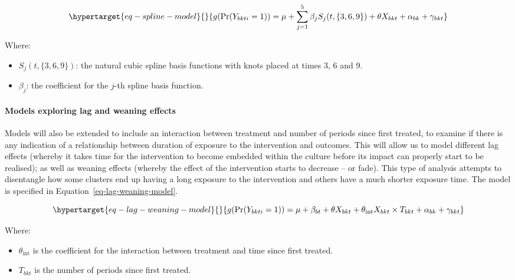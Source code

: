 \documentclass[
]{scrartcl}
\let\oldparagraph\paragraph
\renewcommand{\paragraph}[1]{\oldparagraph{#1}\mbox{}}
\providecommand{\tightlist}{%
  \setlength{\itemsep}{0pt}\setlength{\parskip}{0pt}}\usepackage{longtable,booktabs,array}
\begin{document}
\begin{equation}\protect\hypertarget{eq-spline-model}{}{
g(\text{Pr}(Y_{bkti} = 1)) = \mu + \sum_{j=1}^5 \beta_j S_j(t, \{3, 6, 9\}) + \theta X_{bkt} + \alpha_{bk} + \gamma_{bkt}
}\label{eq-spline-model}\end{equation}

Where:

\begin{itemize}
\tightlist
\item
  \(S_j(t, \{3, 6, 9\})\): the natural cubic spline basis functions with
  knots placed at times 3, 6 and 9.
\item
  \(\beta_j\): the coefficient for the \(j\)-th spline basis function.
\end{itemize}

\hypertarget{models-exploring-lag-and-weaning-effects}{%
\paragraph{Models exploring lag and weaning
effects}\label{models-exploring-lag-and-weaning-effects}}

Models will also be extended to include an interaction between treatment
and number of periods since first treated, to examine if there is any
indication of a relationship between duration of exposure to the
intervention and outcomes. This will allow us to model different lag
effects (whereby it takes time for the intervention to become embedded
within the culture before its impact can properly start to be realised);
as well as weaning effects (whereby the effect of the intervention
starts to decrease -- or fade). This type of analysis attempts to
disentangle how some clusters end up having a long exposure to the
intervention and others have a much shorter exposure time. The model is
specified in Equation~\ref{eq-lag-weaning-model}.

\begin{equation}\protect\hypertarget{eq-lag-weaning-model}{}{
g(\text{Pr}(Y_{bkti} = 1)) = \mu + \beta_{bt} + \theta X_{bkt} + \theta_{\text{int}} X_{bkt} \times T_{bkt} + \alpha_{bk} + \gamma_{bkt}
}\label{eq-lag-weaning-model}\end{equation}

Where:

\begin{itemize}
\tightlist
\item
  \(\theta_{\text{int}}\) is the coefficient for the interaction between
  treatment and time since first treated.
\item
  \(T_{bkt}\) is the number of periods since first treated.
\end{itemize}
\end{document}
